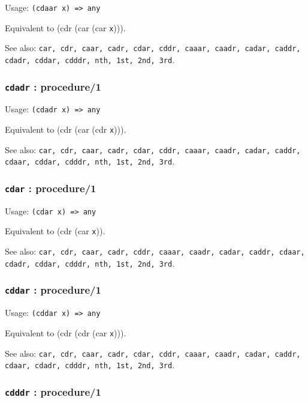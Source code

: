 \documentclass[
]{article}
\newcommand{\passthrough}[1]{#1}
\begin{document}
Usage: \passthrough{\lstinline!(cdaar x) => any!}

Equivalent to (cdr (car (car \passthrough{\lstinline!x!}))).

See also:
\passthrough{\lstinline!car, cdr, caar, cadr, cdar, cddr, caaar, caadr, cadar, caddr, cdadr, cddar, cdddr, nth, 1st, 2nd, 3rd!}.

\hypertarget{cdadr-procedure1}{%
\subsubsection{\texorpdfstring{\texttt{cdadr} :
procedure/1}{cdadr : procedure/1}}\label{cdadr-procedure1}}

Usage: \passthrough{\lstinline!(cdadr x) => any!}

Equivalent to (cdr (car (cdr \passthrough{\lstinline!x!}))).

See also:
\passthrough{\lstinline!car, cdr, caar, cadr, cdar, cddr, caaar, caadr, cadar, caddr, cdaar, cddar, cdddr, nth, 1st, 2nd, 3rd!}.

\hypertarget{cdar-procedure1}{%
\subsubsection{\texorpdfstring{\texttt{cdar} :
procedure/1}{cdar : procedure/1}}\label{cdar-procedure1}}

Usage: \passthrough{\lstinline!(cdar x) => any!}

Equivalent to (cdr (car \passthrough{\lstinline!x!})).

See also:
\passthrough{\lstinline!car, cdr, caar, cadr, cddr, caaar, caadr, cadar, caddr, cdaar, cdadr, cddar, cdddr, nth, 1st, 2nd, 3rd!}.

\hypertarget{cddar-procedure1}{%
\subsubsection{\texorpdfstring{\texttt{cddar} :
procedure/1}{cddar : procedure/1}}\label{cddar-procedure1}}

Usage: \passthrough{\lstinline!(cddar x) => any!}

Equivalent to (cdr (cdr (car \passthrough{\lstinline!x!}))).

See also:
\passthrough{\lstinline!car, cdr, caar, cadr, cdar, cddr, caaar, caadr, cadar, caddr, cdaar, cdadr, cdddr, nth, 1st, 2nd, 3rd!}.

\hypertarget{cdddr-procedure1}{%
\subsubsection{\texorpdfstring{\texttt{cdddr} :
procedure/1}{cdddr : procedure/1}}\label{cdddr-procedure1}}
\end{document}
